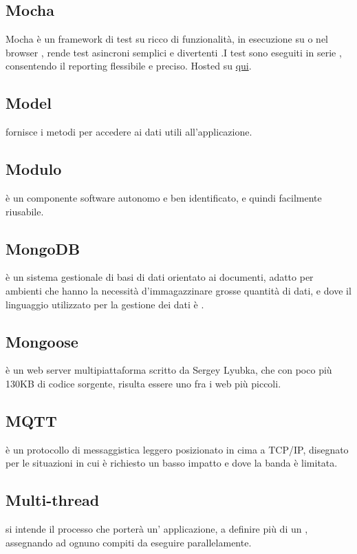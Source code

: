 \documentclass[12pt,a4paper]{article}
\begin{document}
\subsection{Mocha} 
 Mocha è un framework di test su  ricco di funzionalità, in esecuzione su  o nel browser , rende test asincroni semplici  e divertenti .I test sono eseguiti in serie , consentendo il reporting flessibile e preciso. Hosted su 
\href{https://github.com/mochajs/mocha}{qui}.

\subsection{Model} 
 fornisce i metodi per accedere ai dati utili all'applicazione.

\subsection{Modulo} 
 è un componente software autonomo e ben identificato, e quindi facilmente riusabile.

\subsection{MongoDB} 
 è un sistema gestionale di basi di dati  orientato ai documenti, adatto per ambienti che hanno la necessità d'immagazzinare grosse quantità di dati, e dove il linguaggio utilizzato per la gestione dei dati è .

\subsection{Mongoose} 
 è un web server multipiattaforma scritto da Sergey Lyubka, che con poco più 130KB di codice sorgente, risulta essere uno fra i  web più piccoli.

\subsection{MQTT} 
 è un protocollo di messaggistica leggero posizionato in cima a TCP/IP, disegnato per le situazioni in cui è richiesto un basso impatto e dove la banda è limitata.

\subsection{Multi-thread} 
 si intende il processo che porterà un' applicazione, a definire più di un , assegnando ad ognuno compiti da eseguire parallelamente.
\end{document}
